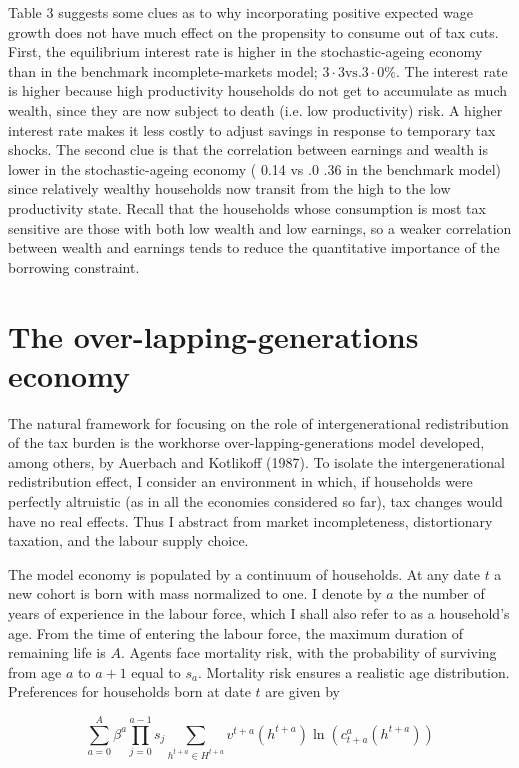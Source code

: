 \documentclass[11pt]{article}
\begin{document}
Table 3 suggests some clues as to why incorporating positive expected wage growth does not have much effect on the propensity to consume out of tax cuts. First, the equilibrium interest rate is higher in the stochastic-ageing economy than in the benchmark incomplete-markets model; $3 \cdot 3 \mathrm{vs} .3 \cdot 0 \%$. The interest rate is higher because high productivity households do not get to accumulate as much wealth, since they are now subject to death (i.e. low productivity) risk. A higher interest rate makes it less costly to adjust savings in response to temporary tax shocks. The second clue is that the correlation between earnings and wealth is lower in the stochastic-ageing economy ( 0.14 vs .0 .36 in the benchmark model) since relatively wealthy households now transit from the high to the low productivity state. Recall that the households whose consumption is most tax sensitive are those with both low wealth and low earnings, so a weaker correlation between wealth and earnings tends to reduce the quantitative importance of the borrowing constraint.

\section*{The over-lapping-generations economy}
The natural framework for focusing on the role of intergenerational redistribution of the tax burden is the workhorse over-lapping-generations model developed, among others, by Auerbach and Kotlikoff (1987). To isolate the intergenerational redistribution effect, I consider an environment in which, if households were perfectly altruistic (as in all the economies considered so far), tax changes would have no real effects. Thus I abstract from market incompleteness, distortionary taxation, and the labour supply choice.

The model economy is populated by a continuum of households. At any date $t$ a new cohort is born with mass normalized to one. I denote by $a$ the number of years of experience in the labour force, which I shall also refer to as a household's age. From the time of entering the labour force, the maximum duration of remaining life is $A$. Agents face mortality risk, with the probability of surviving from age $a$ to $a+1$ equal to $s_{a}$. Mortality risk ensures a realistic age distribution. Preferences for households born at date $t$ are given by

$$
\sum_{a=0}^{A} \beta^{a} \prod_{j=0}^{a-1} s_{j} \sum_{h^{t+a} \in H^{t+a}} v^{t+a}\left(h^{t+a}\right) \ln \left(c_{t+a}^{a}\left(h^{t+a}\right)\right)
$$
\end{document}
